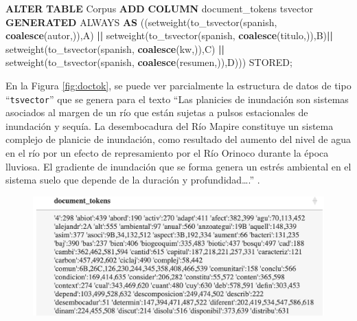 \documentclass[
  12pt,
  openany]{book}
\newenvironment{Shaded}{\begin{snugshade}}{\end{snugshade}}
\newcommand{\FunctionTok}[1]{\textcolor[rgb]{0.13,0.29,0.53}{\textbf{#1}}}
\newcommand{\KeywordTok}[1]{\textcolor[rgb]{0.13,0.29,0.53}{\textbf{#1}}}
\newcommand{\NormalTok}[1]{#1}
\newcommand{\OperatorTok}[1]{\textcolor[rgb]{0.81,0.36,0.00}{\textbf{#1}}}
\newcommand{\StringTok}[1]{\textcolor[rgb]{0.31,0.60,0.02}{#1}}
\begin{document}
\begin{enumerate}
\begin{enumerate}
\begin{Shaded}
\begin{Highlighting}[]
\KeywordTok{ALTER} \KeywordTok{TABLE}\NormalTok{ Corpus }\KeywordTok{ADD} \KeywordTok{COLUMN}\NormalTok{ document\_tokens tsvector}
\KeywordTok{GENERATED}\NormalTok{ ALWAYS }\KeywordTok{AS}\NormalTok{ ((setweight(to\_tsvector(}\StringTok{\textquotesingle{}spanish\textquotesingle{}}\NormalTok{,}
                        \FunctionTok{coalesce}\NormalTok{(autor,}\StringTok{\textquotesingle{}\textquotesingle{}}\NormalTok{)),}\StringTok{\textquotesingle{}A\textquotesingle{}}\NormalTok{) }\OperatorTok{||}  
\NormalTok{                      setweight(to\_tsvector(}\StringTok{\textquotesingle{}spanish\textquotesingle{}}\NormalTok{,}
                        \FunctionTok{coalesce}\NormalTok{(titulo,}\StringTok{\textquotesingle{}\textquotesingle{}}\NormalTok{)),}\StringTok{\textquotesingle{}B\textquotesingle{}}\NormalTok{)}\OperatorTok{||}  
\NormalTok{                      setweight(to\_tsvector(}\StringTok{\textquotesingle{}spanish\textquotesingle{}}\NormalTok{,}
                        \FunctionTok{coalesce}\NormalTok{(kw,}\StringTok{\textquotesingle{}\textquotesingle{}}\NormalTok{)),}\StringTok{\textquotesingle{}C\textquotesingle{}}\NormalTok{)    }\OperatorTok{||}  
\NormalTok{                        setweight(to\_tsvector(}\StringTok{\textquotesingle{}spanish\textquotesingle{}}\NormalTok{,}
                        \FunctionTok{coalesce}\NormalTok{(resumen,}\StringTok{\textquotesingle{}\textquotesingle{}}\NormalTok{)),}\StringTok{\textquotesingle{}D\textquotesingle{}}\NormalTok{))) }
\NormalTok{                        STORED;}
\end{Highlighting}
\end{Shaded}

    En la Figura \ref{fig:doctok}, se puede ver parcialmente la estructura de datos de tipo ``\texttt{tsvector}'' que se genera para el texto ``Las planicies de inundación son sistemas asociados al margen de un río que están sujetas a pulsos estacionales de inundación y sequía. La desembocadura del Río Mapire constituye un sistema complejo de planicie de inundación, como resultado del aumento del nivel de agua en el río por un efecto de represamiento por el Río Orinoco durante la época lluviosa. El gradiente de inundación que se forma genera un estrés ambiental en el sistema suelo que depende de la duración y profundidad\ldots.'' .

    \begin{figure}

    {\centering \includegraphics[width=0.85\linewidth]{images/05-desarrollo/2_ciclo/esquemas/doc_tokens} 

}
\end{figure}
\end{enumerate}
\end{enumerate}
\end{document}
